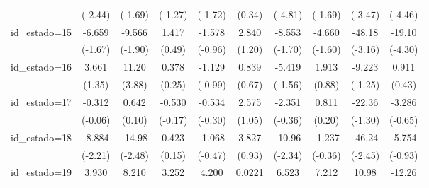 {\begin{tabular}{l*{9}{c}}
                    &     (-2.44)         &     (-1.69)         &     (-1.27)         &     (-1.72)         &      (0.34)         &     (-4.81)         &     (-1.69)         &     (-3.47)         &     (-4.46)         \\
[1em]
id\_estado=15        &      -6.659         &      -9.566         &       1.417         &      -1.578         &       2.840         &      -8.553         &      -4.660         &      -48.18\sym{**} &      -19.10\sym{***}\\
                    &     (-1.67)         &     (-1.90)         &      (0.49)         &     (-0.96)         &      (1.20)         &     (-1.70)         &     (-1.60)         &     (-3.16)         &     (-4.30)         \\
[1em]
id\_estado=16        &       3.661         &       11.20\sym{***}&       0.378         &      -1.129         &       0.839         &      -5.419         &       1.913         &      -9.223         &       0.911         \\
                    &      (1.35)         &      (3.88)         &      (0.25)         &     (-0.99)         &      (0.67)         &     (-1.56)         &      (0.88)         &     (-1.25)         &      (0.43)         \\
[1em]
id\_estado=17        &      -0.312         &       0.642         &      -0.530         &      -0.534         &       2.575         &      -2.351         &       0.811         &      -22.36         &      -3.286         \\
                    &     (-0.06)         &      (0.10)         &     (-0.17)         &     (-0.30)         &      (1.05)         &     (-0.36)         &      (0.20)         &     (-1.30)         &     (-0.65)         \\
[1em]
id\_estado=18        &      -8.884\sym{*}  &      -14.98\sym{*}  &       0.423         &      -1.068         &       3.827         &      -10.96\sym{*}  &      -1.237         &      -46.24\sym{*}  &      -5.754         \\
                    &     (-2.21)         &     (-2.48)         &      (0.15)         &     (-0.47)         &      (0.93)         &     (-2.34)         &     (-0.36)         &     (-2.45)         &     (-0.93)         \\
[1em]
id\_estado=19        &       3.930         &       8.210         &       3.252         &       4.200         &      0.0221         &       6.523\sym{*}  &       7.212\sym{*}  &       10.98         &      -12.26\sym{**} \\

\end{tabular}}
